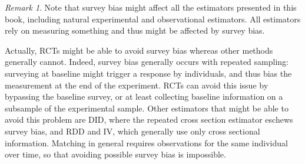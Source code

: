\documentclass[
]{book}
\theoremstyle{definition}
\theoremstyle{definition}
\theoremstyle{definition}
\theoremstyle{definition}
\theoremstyle{remark}
\newtheorem*{remark}{Remark}
\begin{document}
\begin{remark}
\iffalse{} {Remark. } \fi{}Note that survey bias might affect all the estimators presented in this book, including natural experimental and observational estimators.
All estimators rely on measuring something and thus might be affected by survey bias.

Actually, RCTs might be able to avoid survey bias whereas other methods generally cannot.
Indeed, survey bias generally occurs with repeated sampling: surveying at baseline might trigger a response by individuals, and thus bias the measurement at the end of the experiment.
RCTs can avoid this issue by bypassing the baseline survey, or at least collecting baseline information on a subsample of the experimental sample.
Other estimators that might be able to avoid this problem are DID, where the repeated cross section estimator eschews survey bias, and RDD and IV, which generally use only cross sectional information.
Matching in general requires observations for the same individual over time, so that avoiding possible survey bias is impossible.
\end{remark}
\end{document}
